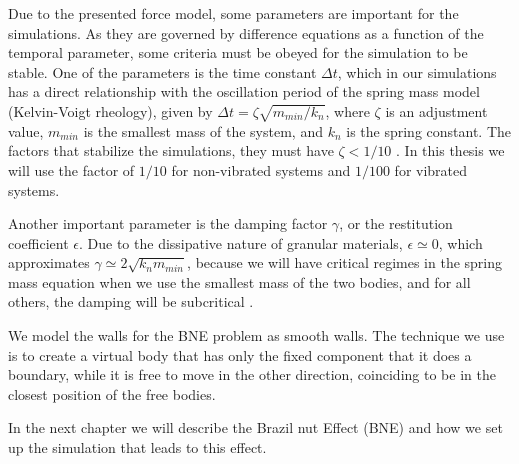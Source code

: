     Due to the presented force model, some parameters are important for the simulations. As they are governed by difference equations as a function of the temporal parameter, some criteria must be obeyed for the simulation to be stable. One of the parameters is the time constant $\Delta t$, which in our simulations has a direct relationship with the oscillation period of the spring mass model (Kelvin-Voigt rheology), given by $\Delta t = \zeta \sqrt{m_{min}/k_{n}}$, where $\zeta$ is an adjustment value, $m_{min}$ is the smallest mass of the system, and $k_{n}$ is the spring constant. The factors that stabilize the simulations, they must have $\zeta < 1/10$ \cite{Dissertacao, Caio-Tese, Computer_Simulation_of_Liquids}. In this thesis we will use the factor of $1/10$ for non-vibrated systems and $1/100$ for vibrated systems. 


    Another important parameter is the damping factor $\gamma$, or the restitution coefficient $\epsilon$. Due to the dissipative nature of granular materials, $\epsilon \simeq 0$, which approximates $\gamma \simeq 2\sqrt{k_{n}{m}_{min}}$, because we will have critical regimes in the spring mass equation when we use the smallest mass of the two bodies, and for all others, the damping will be subcritical \cite{Bouzid-Tese, Luding-Tese}. 

    We model the walls for the BNE problem as smooth walls. The technique we use is to create a virtual body that has only the fixed component that it does a boundary, while it is free to move in the other direction, coinciding to be in the closest position of the free bodies.

    In the next chapter we will describe the Brazil nut Effect (BNE) and how we set up the simulation that leads to this effect.

